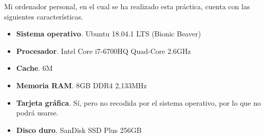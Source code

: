 Mi ordenador personal, en el cual se ha realizado esta práctica, cuenta con las siguientes características.

\begin{itemize}
  \item \textbf{Sistema operativo}. Ubuntu 18.04.1 LTS (Bionic Beaver)
  \item \textbf{Procesador}. Intel Core i7-6700HQ Quad-Core 2.6GHz
  \item \textbf{Cache}. 6M
  \item \textbf{Memoria RAM}. 8GB DDR4 2,133MHz
  \item \textbf{Tarjeta gráfica}. Sí, pero no recodida por el sistema operativo, por lo que no podrá usarse.
  \item \textbf{Disco duro}. SanDisk SSD Plus 256GB
 \end{itemize}
